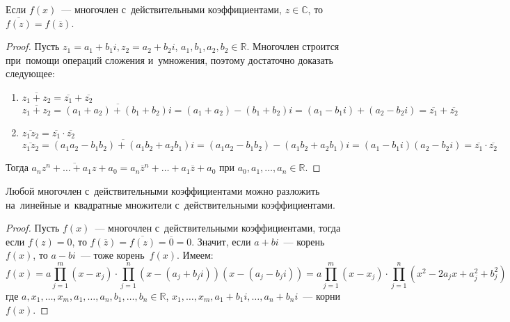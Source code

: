 \begin{lemma}
Если $f(x)$~--- многочлен с~действительными коэффициентами, $z \in \mathbb C$, то $\overline{f(z)} = f(\overline z)$.
\end{lemma}
\begin{proof}
Пусть $z_1 = a_1 + b_1 i, z_2 = a_2 + b_2 i$, $a_1, b_1, a_2, b_2 \in \mathbb R$.
Многочлен строится при~помощи операций сложения и~умножения, поэтому достаточно доказать следующее:
\begin{enumerate}
	\item $\overline{z_1 + z_2} = \overline{z_1} + \overline{z_2}$
	\begin{equation*}
	\overline{z_1 + z_2} = \overline{(a_1 + a_2) + (b_1 + b_2)i} = (a_1 + a_2) - (b_1 + b_2)i =
	(a_1 - b_1 i) + (a_2 - b_2 i) = \overline{z_1} + \overline{z_2}
	\end{equation*}
	
	\item $\overline{z_1 z_2} = \overline{z_1} \cdot \overline{z_2}$
	\begin{equation*}
	\overline{z_1 z_2} = \overline{(a_1 a_2 - b_1 b_2) + (a_1 b_2 + a_2 b_1)i} =
	(a_1 a_2 - b_1 b_2) - (a_1 b_2 + a_2 b_1)i = (a_1 - b_1 i)(a_2 - b_2 i) =
	\overline{z_1} \cdot \overline{z_2}
	\end{equation*}
\end{enumerate}
Тогда $\overline{a_n z^n + \ldots + a_1 z + a_0} = a_n \overline z^n + \ldots + a_1 \overline z + a_0$ при $a_0, a_1, \ldots, a_n \in \mathbb R$.
\end{proof}

\begin{theorem}
\label{th:polynomial_factorization}
Любой многочлен с~действительными коэффициентами можно разложить на~линейные и~квадратные множители с~действительными коэффициентами.
\end{theorem}
\begin{proof}
Пусть $f(x)$~--- многочлен с~действительными коэффициентами, тогда если $f(z) = 0$, то $f(\overline z) = \overline{f(z)} = \overline{0} = 0$.
Значит, если $a + bi$~--- корень~$f(x)$, то $a - bi$~--- тоже корень~$f(x)$.
Имеем:
\begin{equation*}
f(x) = a \prod_{j=1}^{m} (x - x_j) \cdot \prod_{j=1}^{n} (x - (a_j + b_j i))(x - (a_j - b_j i)) =
a \prod_{j=1}^{m} (x - x_j) \cdot \prod_{j=1}^{n} (x^2 - 2a_j x + a_j^2 + b_j^2)
\end{equation*}
где $a, x_1, \ldots, x_m, a_1, \ldots, a_n, b_1, \ldots, b_n \in \mathbb R$,\newline
$x_1, \ldots, x_m, a_1 + b_1 i, \ldots, a_n + b_n i$~--- корни~$f(x)$.
\end{proof}

